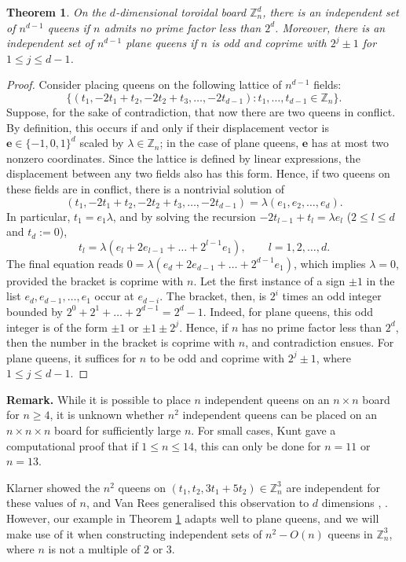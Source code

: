 \documentclass[11pt]{article}
\newtheorem{theorem}[problem]{Theorem}
\begin{document}
\begin{theorem}\label{dim}
On the $d$-dimensional toroidal board $\mathbb{Z}_n^d$, there is an independent set of $n^{d-1}$ queens if $n$ admits no prime factor less than $2^d$. Moreover, there is an independent set of $n^{d-1}$ plane queens if $n$ is odd and coprime with $2^j\pm 1$ for $1\le j\le d-1$.
\end{theorem}

\begin{proof}
Consider placing queens on the following lattice of $n^{d-1}$ fields:
$$\{(t_1,-2t_1+t_2,-2t_2+t_3,\ldots,-2t_{d-1}):t_1,\ldots,t_{d-1}\in \mathbb{Z}_n\}.$$
Suppose, for the sake of contradiction, that now there are two queens in conflict. By definition, this occurs if and only if their displacement vector is $\mathbf{e}\in \{-1,0,1\}^d$ scaled by $\lambda\in \mathbb{Z}_n$; in the case of plane queens, $\mathbf{e}$ has at most two nonzero coordinates. Since the lattice is defined by linear expressions, the displacement between any two fields also has this form. Hence, if two queens on these fields are in conflict, there is a nontrivial solution of
$$(t_1,-2t_1+t_2,-2t_2+t_3,\ldots,-2t_{d-1})=\lambda(e_1,e_2,\ldots,e_d).$$
In particular, $t_1=e_1 \lambda$, and by solving the recursion $-2t_{l-1}+t_l=\lambda e_l$ ($2\le l\le d$ and $t_d:=0$),
$$t_l=\lambda(e_l+2e_{l-1}+\ldots+2^{l-1} e_1),\qquad l=1,2,\ldots,d.$$
The final equation reads $0=\lambda(e_d+2e_{d-1}+\ldots+2^{d-1} e_1)$, which implies $\lambda=0$, provided the bracket is coprime with $n$. Let the first instance of a sign $\pm 1$ in the list $e_d,e_{d-1},\ldots,e_1$ occur at $e_{d-i}$. The bracket, then, is $2^i$ times an odd integer bounded by $2^0+2^1+\ldots+2^{d-1}=2^d-1$. Indeed, for plane queens, this odd integer is of the form $\pm 1$ or $\pm 1\pm 2^j$. Hence, if $n$ has no prime factor less than $2^d$, then the number in the bracket is coprime with $n$, and contradiction ensues. For plane queens, it suffices for $n$ to be odd and coprime with $2^j\pm 1$, where $1\le j\le d-1$.
\end{proof}

\textbf{Remark.} While it is possible to place $n$ independent queens on an $n\times n$ board for $n\ge 4$, it is unknown whether $n^2$ independent queens can be placed on an $n\times n\times n$ board for sufficiently large $n$. For small cases, Kunt \cite{Kun} gave a computational proof that if $1\le n\le 14$, this can only be done for $n=11$ or $n=13$. 

Klarner \cite{Kla} showed the $n^2$ queens on $(t_1,t_2,3t_1+5t_2)\in \mathbb{Z}_n^3$ are independent for these values of $n$, and Van Rees generalised this observation to $d$ dimensions \cite{VaR}, \cite{Kun}. However, our example in Theorem \ref{dim} adapts well to plane queens, and we will make use of it when constructing independent sets of $n^2-O(n)$ queens in $\mathbb{Z}_n^3$, where $n$ is not a multiple of $2$ or $3$.
\end{document}
